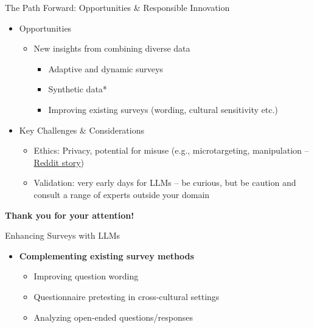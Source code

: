 \documentclass[10pt,aspectratio=169]{beamer}
\begin{document}
\begin{frame}{The Path Forward: Opportunities \& Responsible Innovation}

\begin{itemize}
    \item Opportunities
    \begin{itemize}
        \item New insights from combining diverse data
        \begin{itemize}
            \item Adaptive and dynamic surveys 
            \item Synthetic data*
            \item Improving existing surveys (wording, cultural sensitivity etc.)
        \end{itemize}
    \end{itemize}
    \item Key Challenges \& Considerations
    \begin{itemize}
        \item Ethics: Privacy, potential for misuse (e.g., microtargeting, manipulation -- \href{https://www.reddit.com/r/changemyview/comments/1k8b2hj/comment/mp4vgcm/?share_id=W7n2eWmaRZq3odRwfc_-5}{Reddit story})
        \item Validation: very early days for LLMs -- be curious, but be caution and consult a range of experts outside your domain
    \end{itemize}
\end{itemize}


\end{frame}




\begin{frame}{}

\bigskip 

\textbf{\Large Thank you for your attention!}
\bigskip 


    
\end{frame}











\begin{frame}{Enhancing Surveys with LLMs}
\begin{itemize}
    \item \textbf{Complementing existing survey methods }
    \begin{itemize}
        \item Improving question wording \textcolor{gray}{\citep{wang2024autosurvey}}  
        \item Questionnaire pretesting in cross-cultural settings \textcolor{gray}{\citep{adhikari2025exploring}}
        \item Analyzing open-ended questions/responses \textcolor{gray}{\citep{mellon2024ais}}
    \end{itemize} 
\end{itemize}
\end{frame}
\end{document}
